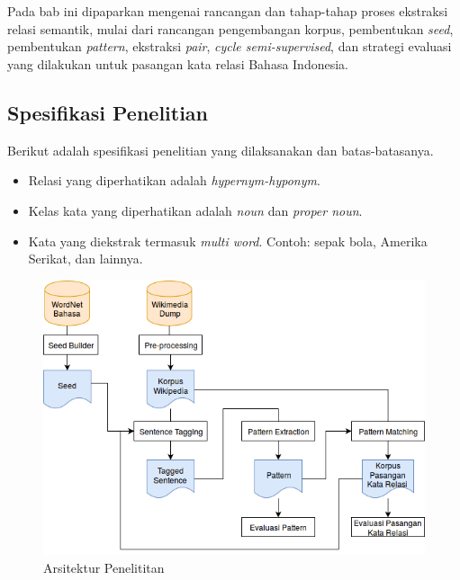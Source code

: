 \chapter{\babTiga}
Pada bab ini dipaparkan mengenai rancangan dan tahap-tahap proses ekstraksi relasi semantik, mulai dari rancangan pengembangan korpus, pembentukan \textit{seed}, pembentukan \textit{pattern}, ekstraksi \textit{pair}, \textit{cycle semi-supervised}, dan strategi evaluasi yang dilakukan untuk pasangan kata relasi Bahasa Indonesia. 


\section{Spesifikasi Penelitian}
Berikut adalah spesifikasi penelitian yang dilaksanakan dan batas-batasanya.
\begin{itemize}
  \item Relasi yang diperhatikan adalah \textit{hypernym-hyponym}.
  \item Kelas kata yang diperhatikan adalah \textit{noun} dan \textit{proper noun}.
  \item Kata yang diekstrak termasuk \textit{multi word}. Contoh: sepak bola, Amerika Serikat, dan lainnya.
\end{itemize}

\begin{figure}
    \centering
    \includegraphics[width=\linewidth]{pics/Pic01-SemiSupervisedCycle}
    \caption{Arsitektur Penelititan}
    \label{fig:arsitektur-penelitian}
\end{figure}
